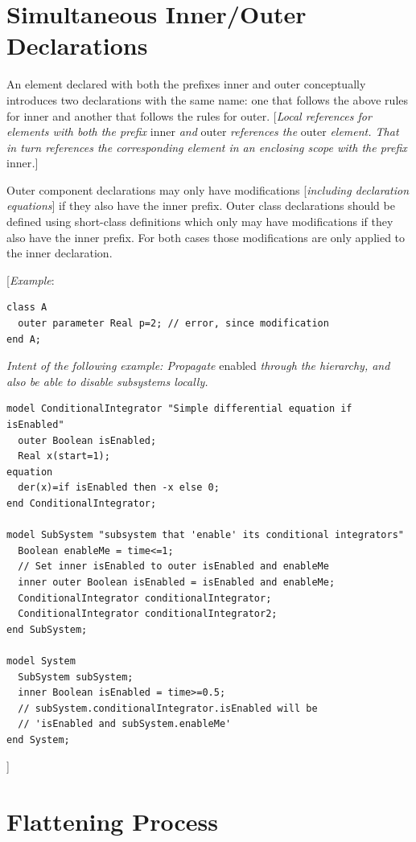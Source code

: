 \documentclass[10pt,a4paper]{report}
\def\doublelabel#1{\label{#1}\hypertarget{#1}{}}
\begin{document}
\section{Simultaneous Inner/Outer Declarations}\doublelabel{simultaneous-inner-outer-declarations}

An element declared with both the prefixes inner and outer conceptually
introduces two declarations with the same name: one that follows the
above rules for inner and another that follows the rules for outer.
{[}\emph{Local references for elements with both the prefix} inner
\emph{and} outer \emph{references the} outer \emph{element. That in turn
references the corresponding element in an enclosing scope with the
prefix} inner\emph{.}{]}

Outer component declarations may only have modifications
{[}\emph{including declaration equations}{]} if they also have the inner
prefix. Outer class declarations should be defined using short-class
definitions which only may have modifications if they also have the
inner prefix. For both cases those modifications are only applied to the
inner declaration.

{[}\emph{Example}:
\begin{lstlisting}[language=modelica]
class A
  outer parameter Real p=2; // error, since modification
end A;
\end{lstlisting}

\emph{Intent of the following example: Propagate} enabled \emph{through
the hierarchy, and also be able to disable subsystems locally.}
\begin{lstlisting}[language=modelica]
model ConditionalIntegrator "Simple differential equation if isEnabled"
  outer Boolean isEnabled;
  Real x(start=1);
equation
  der(x)=if isEnabled then -x else 0;
end ConditionalIntegrator;

model SubSystem "subsystem that 'enable' its conditional integrators"
  Boolean enableMe = time<=1;
  // Set inner isEnabled to outer isEnabled and enableMe
  inner outer Boolean isEnabled = isEnabled and enableMe;
  ConditionalIntegrator conditionalIntegrator;
  ConditionalIntegrator conditionalIntegrator2;
end SubSystem;

model System
  SubSystem subSystem;
  inner Boolean isEnabled = time>=0.5;
  // subSystem.conditionalIntegrator.isEnabled will be
  // 'isEnabled and subSystem.enableMe'
end System;
\end{lstlisting}
{]}

\section{Flattening Process}\doublelabel{flattening-process}
\end{document}

